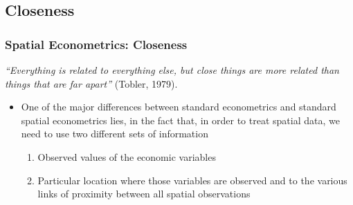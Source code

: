 \documentclass[
  shownotes,
  xcolor={svgnames},
  hyperref={colorlinks,citecolor=DarkBlue,linkcolor=DarkRed,urlcolor=DarkBlue}
   , aspectratio=169]{beamer}
\begin{document}
\begin{frame}[fragile]
\begin{minipage}[t]{0.43\linewidth}
\begin{figure}[H]
  \end{figure}
    \end{minipage}

\end{frame}
\subsection{Closeness }
\begin{frame}[fragile]
\frametitle{Spatial Econometrics: Closeness}

 {\it “Everything is related to everything else, but close things are more related than things that are far apart”} (Tobler, 1979).

\bigskip

\begin{itemize}
  \item One of the major differences between standard econometrics and standard spatial econometrics lies, in the fact that, in order to treat spatial data, we need to use two different sets of information
  \medskip
  \begin{enumerate}
  \item Observed values of the economic variables
  \medskip
  \item Particular location where those variables are observed and to the various links of proximity between all spatial observations
  \end{enumerate}
\end{itemize}

\end{frame}
\end{document}
